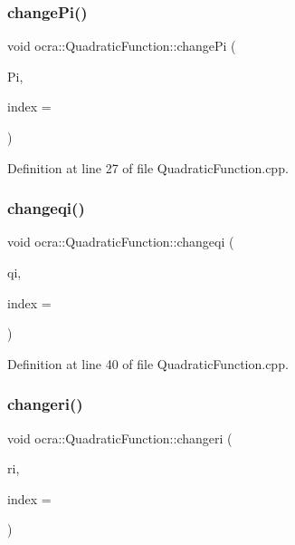 \subsubsection{\texorpdfstring{change\+Pi()}{changePi()}}
{\footnotesize\ttfamily void ocra\+::\+Quadratic\+Function\+::change\+Pi (\begin{DoxyParamCaption}\item[{const Matrix\+Xd \&}]{Pi,  }\item[{int}]{index = {} }\end{DoxyParamCaption})}



Definition at line 27 of file Quadratic\+Function.\+cpp.

\hypertarget{classocra_1_1QuadraticFunction_a338c4fb88dd0a11cf63ff76ed572c895}{}\label{classocra_1_1QuadraticFunction_a338c4fb88dd0a11cf63ff76ed572c895} 
\subsubsection{\texorpdfstring{changeqi()}{changeqi()}}
{\footnotesize\ttfamily void ocra\+::\+Quadratic\+Function\+::changeqi (\begin{DoxyParamCaption}\item[{const Vector\+Xd \&}]{qi,  }\item[{int}]{index = {} }\end{DoxyParamCaption})}



Definition at line 40 of file Quadratic\+Function.\+cpp.

\hypertarget{classocra_1_1QuadraticFunction_a5322e69813282ff9af8a13d00f4cebfc}{}\label{classocra_1_1QuadraticFunction_a5322e69813282ff9af8a13d00f4cebfc} 
\subsubsection{\texorpdfstring{changeri()}{changeri()}}
{\footnotesize\ttfamily void ocra\+::\+Quadratic\+Function\+::changeri (\begin{DoxyParamCaption}\item[{double}]{ri,  }\item[{int}]{index = {} }\end{DoxyParamCaption})}




